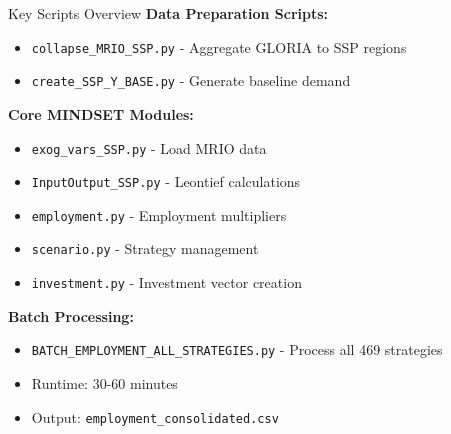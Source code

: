 \documentclass[10pt]{beamer}
\begin{document}
\begin{frame}{Key Scripts Overview}
\textbf{Data Preparation Scripts:}
\begin{itemize}
    \item \texttt{collapse\_MRIO\_SSP.py} - Aggregate GLORIA to SSP regions
    \item \texttt{create\_SSP\_Y\_BASE.py} - Generate baseline demand
\end{itemize}

\vspace{0.3cm}

\textbf{Core MINDSET Modules:}
\begin{itemize}
    \item \texttt{exog\_vars\_SSP.py} - Load MRIO data
    \item \texttt{InputOutput\_SSP.py} - Leontief calculations
    \item \texttt{employment.py} - Employment multipliers
    \item \texttt{scenario.py} - Strategy management
    \item \texttt{investment.py} - Investment vector creation
\end{itemize}

\vspace{0.3cm}

\textbf{Batch Processing:}
\begin{itemize}
    \item \texttt{BATCH\_EMPLOYMENT\_ALL\_STRATEGIES.py} - Process all 469 strategies
    \item Runtime: 30-60 minutes
    \item Output: \texttt{employment\_consolidated.csv}
\end{itemize}
\end{frame}
\end{document}
